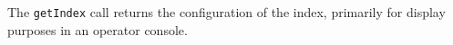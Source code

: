 The \verb+getIndex+ call returns the configuration of the index, primarily for display purposes in
an operator console.
